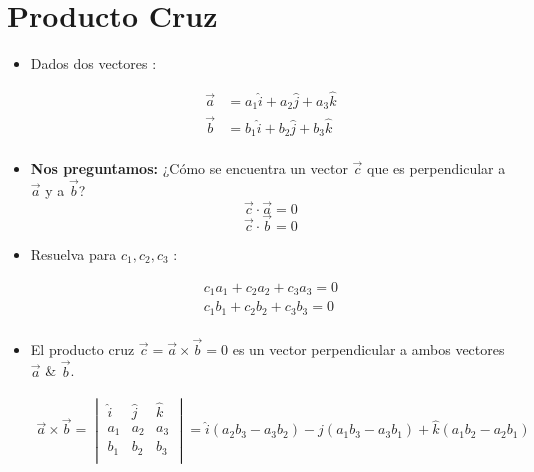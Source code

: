 \section{Producto Cruz}
\begin{itemize}
    \item Dados dos vectores :
        \begin{center}
            \begin{align*}
                \vec{a} & = a_1 \hat{i}  + a_2 \hat{j} + a_3 \hat{k} \\ 
                \vec{b} & = b_1 \hat{i} + b_2 \hat{j} + b_3 \hat{k} \\ 
            \end{align*}
        \end{center}
    
    \item \textbf{Nos preguntamos:} ¿Cómo se encuentra un vector $\vec{c}$  que es perpendicular a $\vec{a}$ y a $\vec{b}$?
        \[
          \vec{c} \cdot \vec{a} = 0 
        \]
        \[
          \vec{c} \cdot \vec{b} = 0 
        \]
    
    \item Resuelva para $c_1,c_2,c_3$ :
        \begin{center}
            \begin{align*}
                c_1a_1+c_2a_2+c_3a_3=0\\ 
                c_1b_1+c_2b_2+c_3b_3=0\\ 
            \end{align*}
        \end{center}
    
    \item El producto cruz $\vec{c}= \vec{a} \times \vec{b} = 0$ es un vector perpendicular a ambos vectores $\vec{a}$ \& $\vec{b}$.
        \begin{center}
            \begin{align*}
                \vec{a}\times \vec{b} = \begin{vmatrix}
                    \hat{i} & \hat{j} & \hat{k} \\ 
                    a_1 & a_2 & a_3 \\ 
                    b_1 & b_2 & b_3 \\ 
                \end{vmatrix} = \hat{i}(a_2b_3 - a_3b_2) - \hat{j}(a_1b_3-a_3b_1)+\hat{k}(a_1b_2-a_2b_1) 
            \end{align*}
        \end{center}
    

\end{itemize}
